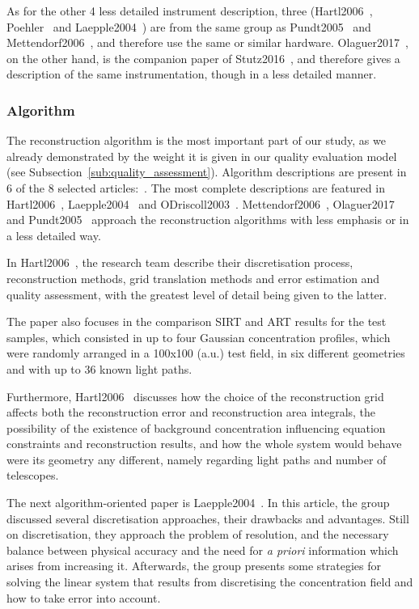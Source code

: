 As for the other 4 less detailed instrument description, three
(Hartl2006~\cite{Hartl2006}, Poehler~\cite{Poehler} and
Laepple2004~\cite{Laepple2004}) are from the same group as
Pundt2005~\cite{Pundt2005} and Mettendorf2006~\cite{Mettendorf2006}, and
therefore use the same or similar hardware.
Olaguer2017~\cite{Olaguer2017}, on the other hand, is the companion
paper of Stutz2016~\cite{Stutz2016}, and therefore gives a description
of the same instrumentation, though in a less detailed manner.

\subsubsection{Algorithm}
\label{ssub:algorithm}

The reconstruction algorithm is the most important part of our study, as
we already demonstrated by the weight it is given in our quality
evaluation model (see Subsection~\ref{sub:quality_assessment}).
Algorithm descriptions are present in 6 of the 8 selected
articles:~\cite{Hartl2006, Laepple2004, Mettendorf2006, ODriscoll2003,
Olaguer2017, Pundt2005}. The most complete descriptions are featured in
Hartl2006~\cite{Hartl2006}, Laepple2004~\cite{Laepple2004} and
ODriscoll2003~\cite{ODriscoll2003}.
Mettendorf2006~\cite{Mettendorf2006}, Olaguer2017~\cite{Olaguer2017} and
Pundt2005~\cite{Pundt2005} approach the reconstruction algorithms with
less emphasis or in a less detailed way.

In Hartl2006~\cite{Hartl2006}, the research team describe their
discretisation process, reconstruction methods, grid translation methods
and error estimation and quality assessment, with the greatest level of
detail being given to the latter.

The paper also focuses in the comparison SIRT and ART results for the
test samples, which consisted in up to four Gaussian concentration
profiles, which were randomly arranged in a 100x100 (a.u.) test field,
in six different geometries and  with up to 36 known light paths.

Furthermore, Hartl2006~\cite{Hartl2006} discusses how the choice of the
reconstruction grid affects both the reconstruction error and
reconstruction area integrals, the possibility of the existence of
background concentration influencing equation constraints and
reconstruction results, and how the whole system would behave were its
geometry any different, namely regarding light paths and number of
telescopes. 

The next algorithm-oriented paper is Laepple2004~\cite{Laepple2004}. In
this article, the group discussed several discretisation approaches,
their drawbacks and advantages. Still on discretisation, they approach
the problem of resolution, and the necessary balance between physical
accuracy and the need for \emph{a priori} information which arises from
increasing it. Afterwards, the group presents some strategies for
solving the linear system that results from discretising the
concentration field and how to take error into account.

